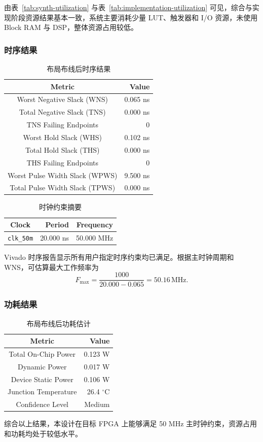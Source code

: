 由表~\ref{tab:synth-utilization} 与表~\ref{tab:implementation-utilization} 可见，综合与实现阶段资源结果基本一致，系统主要消耗少量 LUT、触发器和 I/O 资源，未使用 Block RAM 与 DSP，整体资源占用较低。

\subsubsection{时序结果}

\begin{table}[H]
  \centering
  \caption{布局布线后时序结果}
  \label{tab:implementation-timing}
  \begin{tabular}{c|r}
    \hline
    Metric & Value \\
    \hline
    Worst Negative Slack (WNS) & 0.065 ns \\
    Total Negative Slack (TNS) & 0.000 ns \\
    TNS Failing Endpoints & 0 \\
    Worst Hold Slack (WHS) & 0.102 ns \\
    Total Hold Slack (THS) & 0.000 ns \\
    THS Failing Endpoints & 0 \\
    Worst Pulse Width Slack (WPWS) & 9.500 ns \\
    Total Pulse Width Slack (TPWS) & 0.000 ns \\
    \hline
  \end{tabular}
\end{table}

\begin{table}[H]
  \centering
  \caption{时钟约束摘要}
  \label{tab:implementation-clock-summary}
  \begin{tabular}{c|r|r}
    \hline
    Clock & Period & Frequency \\
    \hline
    \texttt{clk\_50m} & 20.000 ns & 50.000 MHz \\
    \hline
  \end{tabular}
\end{table}

Vivado 时序报告显示所有用户指定时序约束均已满足。根据主时钟周期和 WNS，可估算最大工作频率为
\[
F_{\max}=\frac{1000}{20.000-0.065}=50.16\,\mathrm{MHz}.
\]

\subsubsection{功耗结果}

\begin{table}[H]
  \centering
  \caption{布局布线后功耗估计}
  \label{tab:implementation-power}
  \begin{tabular}{c|r}
    \hline
    Metric & Value \\
    \hline
    Total On-Chip Power & 0.123 W \\
    Dynamic Power & 0.017 W \\
    Device Static Power & 0.106 W \\
    Junction Temperature & 26.4 $^\circ$C \\
    Confidence Level & Medium \\
    \hline
  \end{tabular}
\end{table}

综合以上结果，本设计在目标 FPGA 上能够满足 50 MHz 主时钟约束，资源占用和功耗均处于较低水平。